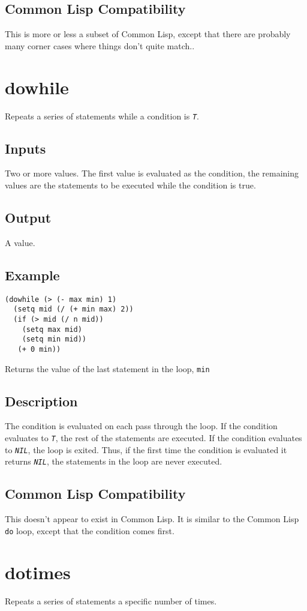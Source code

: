 \documentclass[10pt, openany]{book}
\newcommand{\constant}[1]{\emph{\texttt{#1}}}
\newcommand{\keyword}[1]{\texttt{#1}}
\newcommand{\cl}{Common Lisp}
\begin{document}
\subsection{Common Lisp Compatibility}
This is more or less a subset of \cl, except that there are probably many corner cases where things don't quite match..

\section{dowhile}
Repeats a series of statements while a condition is \constant{T}.
\subsection{Inputs}
Two or more values.  The first value is evaluated as the condition, the remaining values are the statements to be executed while the condition is true.
\subsection{Output}
A value.
\subsection{Example}
\begin{lstlisting}
(dowhile (> (- max min) 1)
  (setq mid (/ (+ min max) 2))
  (if (> mid (/ n mid))
    (setq max mid)
    (setq min mid))
   (+ 0 min))
\end{lstlisting}
Returns the value of the last statement in the loop, \keyword{min}
\subsection{Description}
The condition is evaluated on each pass through the loop.  If the condition evaluates to \constant{T}, the rest of the statements are executed.  If the condition evaluates to \constant{NIL}, the loop is exited.  Thus, if the first time the condition is evaluated it returns \constant{NIL}, the statements in the loop are never executed.
\subsection{Common Lisp Compatibility}
This doesn't appear to exist in \cl.  It is similar to the \cl{} \keyword{do} loop, except that the condition comes first.

\section{dotimes}
Repeats a series of statements a specific number of times.
\end{document}
